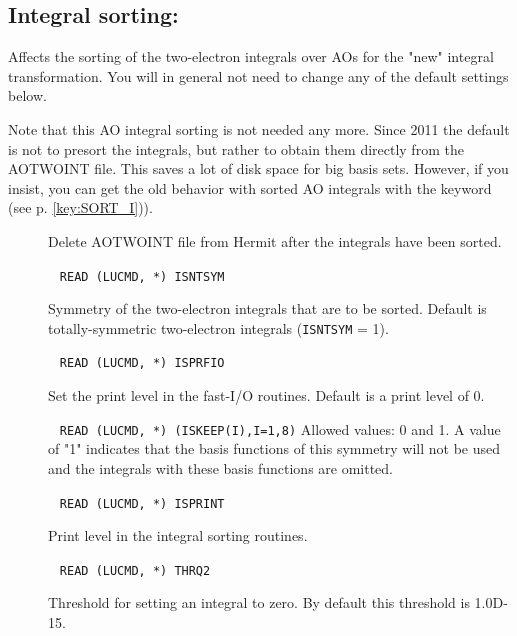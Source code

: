\subsection{Integral sorting: }

Affects the sorting of the two-electron
integrals over AOs for the "new" integral transformation.
You will in general not need to change any of the default settings below.

Note that this AO integral sorting is not needed any more.
Since 2011 the default is not to presort the integrals, but rather
to obtain them directly from the AOTWOINT file.
This saves a lot of disk space for big basis sets.
However, if you insist, you can get the
old behavior with sorted AO integrals with the keyword 
(see p. \ref{key:SORT_I})).

\begin{description}

\item[]

Delete AOTWOINT file from Hermit after the integrals have been sorted.

\item[]\verb| |\newline
\verb|READ (LUCMD, *) ISNTSYM|

Symmetry of the two-electron integrals that are to be sorted.
Default is totally-symmetric two-electron integrals
(\verb|ISNTSYM| = 1).

\item[]\verb| |\newline
\verb|READ (LUCMD, *) ISPRFIO|

Set the print level in the fast-I/O routines. Default is a print level of 0.

\item[]\verb| |\newline
\verb|READ (LUCMD, *) (ISKEEP(I),I=1,8)|\newline
Allowed values: 0 and 1.
A value of "1" indicates that the basis functions of this symmetry will
not be used and the integrals with these basis functions are omitted.


\item[]\verb| |\newline
\verb|READ (LUCMD, *) ISPRINT|

Print level in the integral sorting routines.

\item[]\verb| |\newline
\verb|READ (LUCMD, *) THRQ2|

Threshold for setting an integral to zero. By default this threshold
is 1.0D-15.

\end{description}

